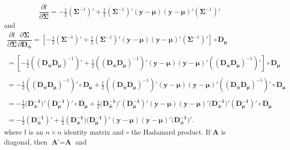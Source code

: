 \documentclass[useAMS,referee]{biom}
\begin{document}
\begin{equation}
\begin{array}{l}
\dfrac{\partial l}{\partial \boldsymbol{\Sigma}} = -\frac{1}{2}(\boldsymbol{\Sigma}^{-1})'+\frac{1}{2}(\boldsymbol{\Sigma}^{-1})'(\mathbf{y}-\boldsymbol{\mu})(\mathbf{y}-\boldsymbol{\mu})'(\boldsymbol{\Sigma}^{-1})'

\end{array}
\end{equation}
and
\begin{equation*}
\begin{array}{l}
\dfrac{\partial l}{\partial \boldsymbol{\Sigma}} \dfrac{\partial \boldsymbol{\Sigma}}{\partial \mathbf{D_\phi}}= \left[-\frac{1}{2}(\boldsymbol{\Sigma}^{-1})'+\frac{1}{2}(\boldsymbol{\Sigma}^{-1})'(\mathbf{y}-\boldsymbol{\mu})(\mathbf{y}-\boldsymbol{\mu})'(\boldsymbol{\Sigma}^{-1})'\right] \circ \mathbf{D_\mu}\\~\\

= \left[-\frac{1}{2}(\mathbf{(D_\phi D_\mu)}^{-1})'+\frac{1}{2}(\mathbf{(D_\phi D_\mu)}^{-1})'(\mathbf{y}-\boldsymbol{\mu})(\mathbf{y}-\boldsymbol{\mu})'(\mathbf{(D_\phi D_\mu)}^{-1})'\right] \circ \mathbf{D_\mu}\\~\\

= -\frac{1}{2}(\mathbf{(D_\phi D_\mu)}^{-1})'\circ\mathbf{D_\mu}+\frac{1}{2}(\mathbf{(D_\phi D_\mu)}^{-1})'(\mathbf{y}-\boldsymbol{\mu})(\mathbf{y}-\boldsymbol{\mu})'(\mathbf{(D_\phi D_\mu)}^{-1})'\circ\mathbf{D_\mu} \\~\\

= -\frac{1}{2}(\mathbf{ D_\phi^{-1})'(D_\mu^{-1})'}\circ\mathbf{D_\mu}+\frac{1}{2}(\mathbf{ D_\phi^{-1})'(D_\mu^{-1})'}(\mathbf{y}-\boldsymbol{\mu})(\mathbf{y}-\boldsymbol{\mu})'(\mathbf{ D_\phi^{-1})'(D_\mu^{-1})'}\circ\mathbf{D_\mu} \\~\\

= -\frac{1}{2}\mathbf{ (D_\phi^{-1})'}+\frac{1}{2}(\mathbf{ D_\phi^{-1})(D_\mu^{-1}})'(\mathbf{y}-\boldsymbol{\mu})(\mathbf{y}-\boldsymbol{\mu})'(\mathbf{D_\phi^{-1})'}.

\end{array}
\end{equation*}
where $\mathbb{I}$ is an $n \times n$ identity matrix and $\circ$ the Hadamard product. If \textbf{A} is diagonal, then $\textbf{A'} = \textbf{A}$ and
\end{document}
